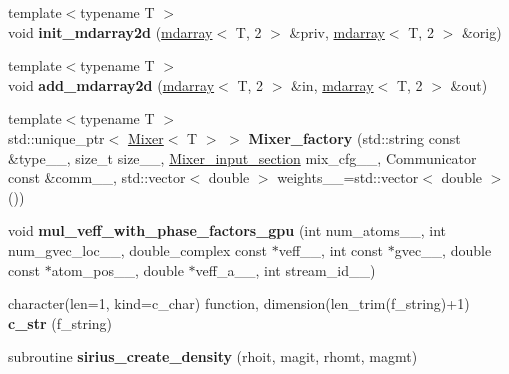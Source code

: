 \begin{DoxyCompactItemize}
\item 
\hypertarget{namespacesirius_af8c7e41103f231c33545723737ebc16f}{}{\footnotesize template$<$typename T $>$ }\\void {\bfseries init\+\_\+mdarray2d} (\hyperlink{classsddk_1_1mdarray}{mdarray}$<$ T, 2 $>$ \&priv, \hyperlink{classsddk_1_1mdarray}{mdarray}$<$ T, 2 $>$ \&orig)\label{namespacesirius_af8c7e41103f231c33545723737ebc16f}

\item 
\hypertarget{namespacesirius_a9aa763500f50832f5ace049da76d7b2d}{}{\footnotesize template$<$typename T $>$ }\\void {\bfseries add\+\_\+mdarray2d} (\hyperlink{classsddk_1_1mdarray}{mdarray}$<$ T, 2 $>$ \&in, \hyperlink{classsddk_1_1mdarray}{mdarray}$<$ T, 2 $>$ \&out)\label{namespacesirius_a9aa763500f50832f5ace049da76d7b2d}

\item 
\hypertarget{namespacesirius_a2b6a0f0c30ea339dd112135370e6057c}{}{\footnotesize template$<$typename T $>$ }\\std\+::unique\+\_\+ptr$<$ \hyperlink{classsirius_1_1_mixer}{Mixer}$<$ T $>$ $>$ {\bfseries Mixer\+\_\+factory} (std\+::string const \&type\+\_\+\+\_\+, size\+\_\+t size\+\_\+\+\_\+, \hyperlink{structsirius_1_1_mixer__input__section}{Mixer\+\_\+input\+\_\+section} mix\+\_\+cfg\+\_\+\+\_\+, Communicator const \&comm\+\_\+\+\_\+, std\+::vector$<$ double $>$ weights\+\_\+\+\_\+=std\+::vector$<$ double $>$())\label{namespacesirius_a2b6a0f0c30ea339dd112135370e6057c}

\item 
\hypertarget{namespacesirius_a96427e0340ff65f3b3a9800597b0a7de}{}void {\bfseries mul\+\_\+veff\+\_\+with\+\_\+phase\+\_\+factors\+\_\+gpu} (int num\+\_\+atoms\+\_\+\+\_\+, int num\+\_\+gvec\+\_\+loc\+\_\+\+\_\+, double\+\_\+complex const $\ast$veff\+\_\+\+\_\+, int const $\ast$gvec\+\_\+\+\_\+, double const $\ast$atom\+\_\+pos\+\_\+\+\_\+, double $\ast$veff\+\_\+a\+\_\+\+\_\+, int stream\+\_\+id\+\_\+\+\_\+)\label{namespacesirius_a96427e0340ff65f3b3a9800597b0a7de}

\item 
\hypertarget{namespacesirius_a87e07575680cc53bfcb964d71da2a2ee}{}character(len=1, kind=c\+\_\+char) function, dimension(len\+\_\+trim(f\+\_\+string)+1) {\bfseries c\+\_\+str} (f\+\_\+string)\label{namespacesirius_a87e07575680cc53bfcb964d71da2a2ee}

\item 
\hypertarget{namespacesirius_a999a7f83caa2beb22081f1ad489b6d48}{}subroutine {\bfseries sirius\+\_\+create\+\_\+density} (rhoit, magit, rhomt, magmt)\label{namespacesirius_a999a7f83caa2beb22081f1ad489b6d48}


\end{DoxyCompactItemize}
